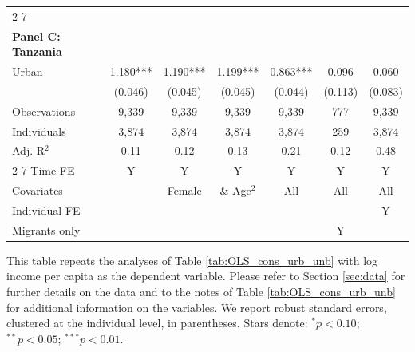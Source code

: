 \begin{table}[htbp]
\begin{threeparttable}
\begin{tabular}{l cccccc}
\cmidrule{2-7}
                    &               &               &               &               &               &               \\
\textbf{Panel C: Tanzania} \\
Urban               &       1.180***&       1.190***&       1.199***&       0.863***&       0.096   &       0.060   \\
                    &     (0.046)   &     (0.045)   &     (0.045)   &     (0.044)   &     (0.113)   &     (0.083)   \\
\addlinespace
Observations        &       9,339   &       9,339   &       9,339   &       9,339   &         777   &       9,339   \\
Individuals         &       3,874   &       3,874   &       3,874   &       3,874   &         259   &       3,874   \\
Adj. R$^{2}$        &        0.11   &        0.12   &        0.13   &        0.21   &        0.12   &        0.48   \\
\cmidrule{2-7} Time FE & Y & Y & Y & Y & Y & Y \\ Covariates & & Female & \& Age$^2$ & All & All & All \\ Individual FE & & & & & & Y \\ Migrants only & & & & & Y & \\ \bottomrule \end{tabular} \begin{tablenotes}[flushleft] \footnotesize \item{This table repeats the analyses of Table \ref{tab:OLS_cons_urb_unb} with log income per capita as the dependent variable. Please refer to Section \ref{sec:data} for further details on the data and to the notes of Table \ref{tab:OLS_cons_urb_unb} for additional information on the variables. We report robust standard errors, clustered at the individual level, in parentheses. Stars denote: $^{*} p<0.10$; $^{**} p<0.05$; $^{***} p<0.01$.} \end{tablenotes} \end{threeparttable} \end{table}
